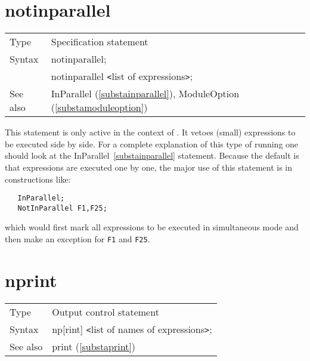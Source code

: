 
\vspace{10mm}


\section{notinparallel}
\label{substanotinparallel}

\noindent \begin{tabular}{ll}
Type & Specification statement\\
Syntax & notinparallel; \\
       & notinparallel {\tt<}list of expressions{\tt>};
\\ See also & InParallel (\ref{substainparallel}), 
     ModuleOption (\ref{substamoduleoption})
\end{tabular} \vspace{4mm}

\noindent This statement is only active in the context of 
\TFORM{}. It vetoes (small) expressions to be executed side by 
side. For a complete explanation of this type of running one should look at 
the InParallel~\ref{substainparallel} statement. Because the default is 
that expressions are executed one by one, the major use of this statement 
is in constructions like:
\begin{verbatim}
   InParallel;
   NotInParallel F1,F25;
\end{verbatim}
which would first mark all expressions to be executed in simultaneous mode 
and then make an exception for {\tt F1} and {\tt F25}.
\vspace{10mm}


\section{nprint}
\label{substanprint}

\noindent \begin{tabular}{ll}
Type & Output control statement\\
Syntax & np[rint] {\tt<}list of names of expressions{\tt>};
\\ See also & print (\ref{substaprint})
\end{tabular} \vspace{4mm}

